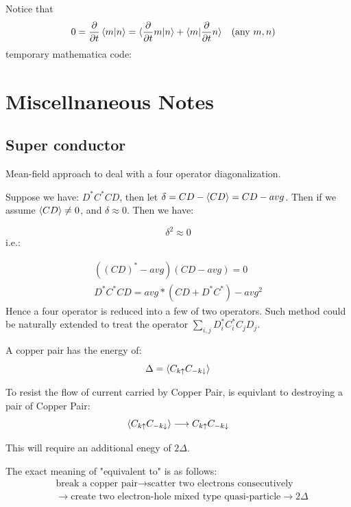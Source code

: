 \documentclass{article}
\numberwithin{equation}{subsection} %
\theoremstyle{definition}
\begin{document}
    Notice that
    \begin{align}
            0= \frac{\partial}{\partial t} \braket{m|n} &=
        \braket{\frac{\partial}{\partial t}m|n} +
        \braket{m|\frac{\partial}{\partial t}n} &&(\text{any }m,n)
    \end{align}
    temporary mathematica code:

    

\section{Miscellnaneous Notes}
    \subsection{Super conductor}
    Mean-field approach to deal with a four operator diagonalization.
    
    Suppose we have: $D^*C^* CD$, then let $\delta = CD - \braket{CD} =
    CD - avg$. Then if we assume $\braket{CD}\neq 0$, and $\delta \approx 0$. Then we have:
    
    	$$ \delta^2 \approx 0 $$
    i.e.:
    
    \begin{align}
    	( (CD)^* - avg ) ( CD - avg ) = 0\\
    	D^*C^*CD = avg*(CD+D^*C^*) - avg^2
    \end{align}
    Hence a four operator is reduced into a few of two operators.
    Such method could be naturally extended to treat the operator
    $\sum_{i,j} D^*_i C^*_i C_j D_j$.
    
    A copper pair has the energy of:
    $$\Delta = \braket{C_{k \uparrow}C_{-k \downarrow} }$$
    
    To resist the flow of current carried by Copper Pair, is equivlant to destroying a pair of Copper Pair:
    $$ \braket{C_{k \uparrow}C_{-k \downarrow} } \longrightarrow C_{k \uparrow}C_{-k \downarrow}$$
    
    This will require an additional enegy of $2\Delta$.
    
    The exact meaning of "equivalent to" is as follows:
    \begin{align}
        & \text{break a copper pair} \longrightarrow 
        \text{scatter two electrons consecutively} 
        \nonumber\\ & \longrightarrow 
        \text{create two electron-hole mixed type quasi-particle} \longrightarrow 2\Delta \nonumber
    \end{align}
\end{document}
